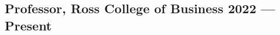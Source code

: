 

\subsection{{Professor, Ross College of Business \hfill 2022 --- Present}} 
\begin{zitemize}



\end{zitemize}
